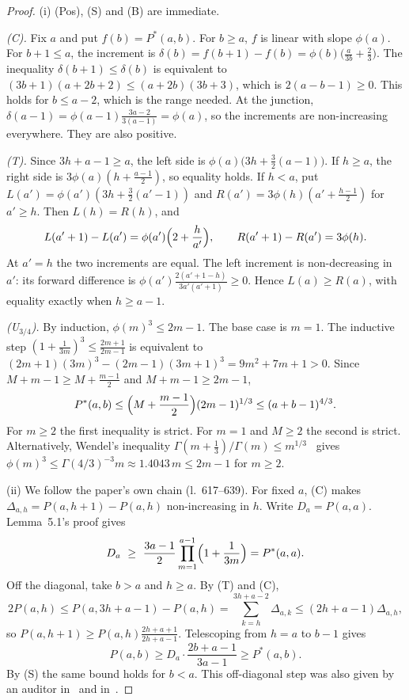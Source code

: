 \documentclass[11pt]{amsart}
\theoremstyle{remark}
\begin{document}
\begin{proof}
(i) (Pos), (S) and (B) are immediate.

\emph{(C).} Fix $a$ and put $f(b)=P^*(a,b)$. For $b\ge a$, $f$ is linear
with slope $\phi(a)$. For $b+1\le a$, the increment is
$\delta(b)=f(b+1)-f(b)=\phi(b)\bigl(\frac{a}{3b}+\frac23\bigr)$. The
inequality $\delta(b+1)\le\delta(b)$ is equivalent to
$(3b+1)(a+2b+2)\le(a+2b)(3b+3)$, which is $2(a-b-1)\ge0$. This holds for
$b\le a-2$, which is the range needed. At the junction,
$\delta(a-1)=\phi(a-1)\frac{3a-2}{3(a-1)}=\phi(a)$, so the increments are
non-increasing everywhere. They are also positive.

\emph{(T).} Since $3h+a-1\ge a$, the left side is
$\phi(a)\bigl(3h+\frac32(a-1)\bigr)$. If $h\ge a$, the right side is
$3\phi(a)(h+\frac{a-1}2)$, so equality holds. If $h<a$, put
$L(a')=\phi(a')(3h+\frac32(a'-1))$ and $R(a')=3\phi(h)(a'+\frac{h-1}{2})$ for
$a'\ge h$. Then $L(h)=R(h)$, and
\[
L(a'+1)-L(a')=\phi(a')\Bigl(2+\frac{h}{a'}\Bigr),\qquad R(a'+1)-R(a')=3\phi(h).
\]
At $a'=h$ the two increments are equal. The left increment is non-decreasing
in $a'$: its forward difference is
$\phi(a')\frac{2(a'+1-h)}{3a'(a'+1)}\ge0$. Hence $L(a)\ge R(a)$, with equality
exactly when $h\ge a-1$.

\emph{(U$_{3/4}$).} By induction, $\phi(m)^3\le 2m-1$. The base case is
$m=1$. The inductive step $(1+\frac1{3m})^3\le\frac{2m+1}{2m-1}$ is
equivalent to $(2m+1)(3m)^3-(2m-1)(3m+1)^3=9m^2+7m+1>0$. Since
$M+m-1\ge M+\frac{m-1}2$ and $M+m-1\ge 2m-1$,
\[
P^*(a,b)\le\Bigl(M+\frac{m-1}{2}\Bigr)(2m-1)^{1/3}\le (a+b-1)^{4/3}.
\]
For $m\ge2$ the first inequality is strict. For $m=1$ and $M\ge2$ the second
is strict. Alternatively, Wendel's inequality
$\Gamma(m+\frac13)/\Gamma(m)\le m^{1/3}$~\cite{Wendel} gives
$\phi(m)^3\le\Gamma(4/3)^{-3}m\approx1.4043\,m\le 2m-1$ for $m\ge2$.

(ii) We follow the paper's own chain (l.~617--639). For fixed $a$, (C) makes
$\Delta_{a,h}=P(a,h+1)-P(a,h)$ non-increasing in $h$. Write $D_a=P(a,a)$.
Lemma~5.1's proof gives
\begin{equation}\label{eq:H}
D_a\ \ge\ \frac{3a-1}{2}\prod_{m=1}^{a-1}\Bigl(1+\frac1{3m}\Bigr)=P^*(a,a).
\end{equation}
Off the diagonal, take $b>a$ and $h\ge a$. By (T) and (C),
\[
2P(a,h)\le P(a,3h+a-1)-P(a,h)=\sum_{k=h}^{3h+a-2}\Delta_{a,k}\le(2h+a-1)\Delta_{a,h},
\]
so $P(a,h+1)\ge P(a,h)\frac{2h+a+1}{2h+a-1}$. Telescoping from $h=a$ to
$b-1$ gives
\[
P(a,b)\ge D_a\cdot\frac{2b+a-1}{3a-1}\ge P^*(a,b).
\]
By (S) the same bound holds for $b<a$. This off-diagonal step was also given
by an auditor in~\cite{EC} and in~\cite[Codex round~3, (1)]{SUPP}.


\end{proof}
\end{document}
